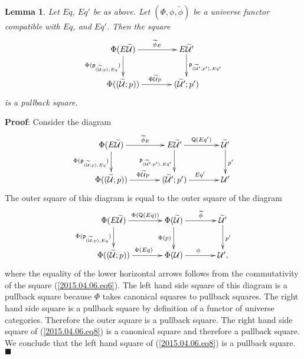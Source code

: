 \documentclass[12pt]{article}
\numberwithin{equation}{section}
\newenvironment{eq}{\begin{equation}}{\end{equation}}
\newenvironment{myproof}{{\bf Proof}:}{$\blacksquare$ \vskip 5mm }
\newtheorem{lemma}[proposition]{Lemma}
\newcommand{\wt}{\widetilde}
\newcommand{\p}{\mathsf{p}}
\newcommand{\U}{\mathcal{U}}
\newcommand{\Q}{\mathsf{Q}}
\begin{document}
\begin{lemma}
\label{2015.04.06.l4} Let $Eq$, $Eq'$ be as above. Let $(\Phi,\phi,\wt{\phi})$
be a universe functor compatible with $Eq$, and $Eq'$. Then the square
%
$$
\begin{xy}
          \xymatrix@C=3pc{ \Phi(E\wt{\U}) \ar[r]^-{\wt{\phi}_{E}}
            \ar[d]_{\Phi(\p_{(\wt{\U};p),Eq})} & E\wt{\U}'
            \ar[d]^{\p_{(\wt{\U}';p'),Eq'}}\\ \Phi((\wt{\U};p))
            \ar[r]^{\Phi\wt{\U}p} & (\wt{\U}';p') }
\end{xy}
$$
%
is a pullback square.
%
\end{lemma} 
%
\begin{myproof}
Consider the diagram
%
\begin{eq}\label{2015.04.06.eq8}
\begin{xy}
          \xymatrix@C=3pc{ \Phi(E\wt{\U})
            \ar[r]^-{\wt{\phi}_{E}}\ar[d]_{\Phi(\p_{(\wt{\U};p),Eq})} & E\wt{\U}'
            \ar[r]^-{\Q(Eq')}\ar[d]_{\p_{(\wt{\U}';p'),Eq'}} & \wt{\U}'
            \ar[d]^{p'}\\ \Phi((\wt{\U};p)) \ar[r]^{\Phi\wt{\U}p} & (\wt{\U}';p')
            \ar[r]^{Eq'} & \U' }
\end{xy}
\end{eq}%
%
The outer square of this diagram is equal to the outer square of the diagram
%
\begin{eq}\label{2015.04.06.eq7}
\begin{xy}
          \xymatrix@C=3pc{ \Phi(E\wt{\U})
            \ar[r]^-{\Phi(\Q(Eq))}\ar[d]_{\Phi(\p_{(\wt{\U};p),Eq})} &
            \Phi(\wt{\U}) \ar[r]^-{\wt{\phi}}\ar[d]_{\Phi(p)} & \wt{\U}'
            \ar[d]^{p'}\\ \Phi((\wt{\U};p)) \ar[r]^{\Phi(Eq)} & \Phi(\U)
            \ar[r]^{\phi} & \U', }
\end{xy}
\end{eq}%
%
where the equality of the lower horizontal arrows follows from the
commutativity of the square (\ref{2015.04.06.eq6}). The left hand side square
of this diagram is a pullback square because $\Phi$ takes canonical squares to
pullback squares. The right hand side square is a pullback square by definition
of a functor of universe categories. Therefore the outer square is a pullback
square. The right hand side square of (\ref{2015.04.06.eq8}) is a canonical
square and therefore a pullback square. We conclude that the left hand square
of (\ref{2015.04.06.eq8}) is a pullback square.
\end{myproof}
\end{document}

